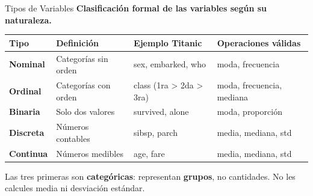 \documentclass[aspectratio=169, 11pt]{beamer}
\begin{document}
\begin{frame}[shrink=5]{Tipos de Variables}
  \vspace{-4pt}
  {\footnotesize\color{arcaDark}\bfseries
    Clasificación formal de las variables según su naturaleza.}

  \vspace{6pt}
  {\scriptsize
  \begin{tabular}{@{}llll@{}}
    \toprule
    \textbf{Tipo} & \textbf{Definición} & \textbf{Ejemplo Titanic} & \textbf{Operaciones válidas} \\
    \midrule
    \textbf{Nominal} & Categorías sin orden & sex, embarked, who &
      moda, frecuencia \\
    \textbf{Ordinal} & Categorías con orden & class (1ra > 2da > 3ra) &
      moda, frecuencia, mediana \\
    \textbf{Binaria} & Solo dos valores & survived, alone &
      moda, proporción \\
    \midrule
    \textbf{Discreta} & Números contables & sibsp, parch &
      media, mediana, std \\
    \textbf{Continua} & Números medibles & age, fare &
      media, mediana, std \\
    \bottomrule
  \end{tabular}
  }

  \vspace{6pt}
  {\footnotesize\color{arcaDark}
    \faLightbulb\hspace{4pt}
    Las tres primeras son \textbf{categóricas}: representan \textbf{grupos},
    no cantidades. No les calcules media ni desviación estándar.}
\end{frame}
\end{document}
